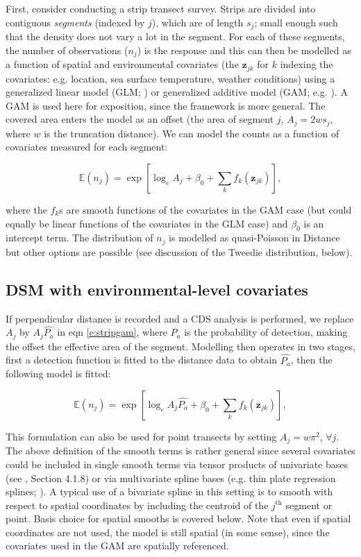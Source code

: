 \documentclass[a4paper,12pt]{article}
\begin{document}
First, consider conducting a strip transect survey. Strips are divided into contiguous \textit{segments} (indexed by $j$), which are of length $s_j$; small enough such that the density does not vary a lot in the segment. For each of these segments, the number of observations ($n_j$) is the response and this can then be modelled as a function of spatial and environmental covariates (the $\mathbf{z}_{jk}$ for $k$ indexing the covariates: e.g. location, sea surface temperature, weather conditions) using a generalized linear model (GLM; \cite{McCullagh:1989ux}) or generalized additive model (GAM; e.g. \cite{Wood:2006wz}). A GAM is used here for exposition, since the framework is more general. The covered area enters the model as an offset (the area of segment $j$, $A_j = 2ws_j$, where $w$ is the truncation distance). We can model the counts as a function of covariates measured for each segment:

\begin{equation}
\mathbb{E}(n_j) = \exp\left[ \log_e A_j + \beta_0 + \sum_k f_k\left(\bm{z}_{jk}\right) \right],
\label{e:stripgam}
\end{equation}

where the $f_k$s are smooth functions of the covariates in the GAM case (but could equally be linear functions of the covariates in the GLM case) and $\beta_0$ is an intercept term. The distribution of $n_j$ is modelled as quasi-Poisson in Distance but other options are possible (see discussion of the Tweedie distribution, below).

\subsection*{DSM with environmental-level covariates}

If perpendicular distance is recorded and a CDS analysis is performed, we replace $A_j$ by $A_j\hat{P_a}$ in eqn \ref{e:stripgam}, where $\hat{P_a}$ is the probability of detection, making the offset the effective area of the segment. Modelling then operates in two stages, first a detection function is fitted to the distance data to obtain $\hat{P_a}$, then the following model is fitted:

\begin{equation}
\mathbb{E}(n_j) = \exp\left[ \log_e A_j\hat{P_a} + \beta_0 + \sum_k f_k\left(\bm{z}_{jk}\right) \right],
\label{e:gamn}
\end{equation}

This formulation can also be used for point transects by setting $A_j=w\pi^2$, $\forall j$. The above definition of the smooth terms is rather general since several covariates could be included in single smooth terms via tensor products of univariate bases (see \cite{Wood:2006wz}, Section 4.1.8) or via multivariate spline bases (e.g. thin plate regression splines; \cite{Wood:2003tc}). A typical use of a bivariate spline in this setting is to smooth with respect to spatial coordinates by including the centroid of the $j^\text{th}$ segment or point. Basis choice for spatial smooths is covered below. Note that even if spatial coordinates are not used, the model is still spatial (in some sense), since the covariates used in the GAM are spatially referenced.
\end{document}
